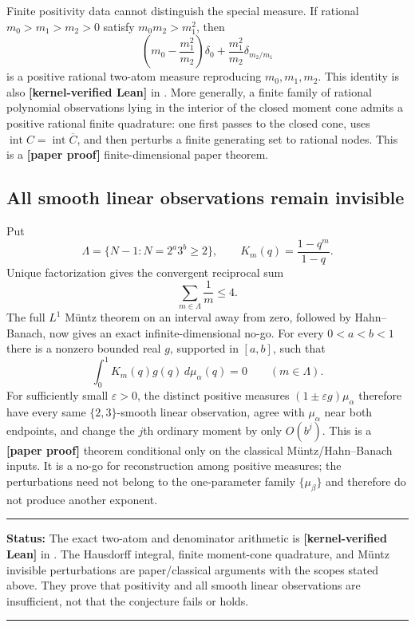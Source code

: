 \documentclass[11pt,oneside]{article}
\theoremstyle{definition}
\theoremstyle{remark}
\newcommand{\lean}[1]{\texttt{\detokenize{#1}}}
\newcommand{\statuslean}{\textcolor{leanblue}{\textbf{[kernel-verified Lean]}}}
\newcommand{\statusnew}{\textcolor{newgreen}{\textbf{[paper proof]}}}
\newenvironment{statusbox}[1]
{\begin{center}\begin{minipage}{0.94\textwidth}\raggedright\hbadness=10000\hrule
\vspace{0.45em}\textbf{Status:} #1\par\vspace{0.35em}}
{\vspace{0.35em}\hrule\end{minipage}\end{center}}
\begin{document}
Finite positivity data cannot distinguish the special measure.  If rational
$m_0>m_1>m_2>0$ satisfy $m_0m_2>m_1^2$, then
\begin{equation}
 \left(m_0-\frac{m_1^2}{m_2}\right)\delta_0
 +\frac{m_1^2}{m_2}\delta_{m_2/m_1}
 \label{mom:eq-two-atom}
\end{equation}
is a positive rational two-atom measure reproducing $m_0,m_1,m_2$.  This identity is also
\statuslean{} in \lean{MomentArithmetic}.  More generally, a finite family of
rational polynomial observations lying in the interior of the closed moment cone admits a
positive rational finite quadrature: one first passes to the closed cone, uses
$\operatorname{int}C=\operatorname{int}\overline C$, and then perturbs a finite generating
set to rational nodes.  This is a \statusnew{} finite-dimensional paper theorem.

\subsection{All smooth linear observations remain invisible}
\label{mom:muntz}

Put
\[
 \Lambda=\{N-1:N=2^a3^b\ge2\},\qquad
 K_m(q)=\frac{1-q^m}{1-q}.
\]
Unique factorization gives the convergent reciprocal sum
\begin{equation}
 \sum_{m\in\Lambda}\frac1m\le4.
 \label{mom:eq-muntz-sum}
\end{equation}
The full $L^1$ M\"untz theorem on an interval away from zero, followed by Hahn--Banach, now
gives an exact infinite-dimensional no-go.  For every $0<a<b<1$ there is a nonzero bounded
real $g$, supported in $[a,b]$, such that
\begin{equation}
 \int_0^1K_m(q)g(q)\,d\mu_\alpha(q)=0\qquad(m\in\Lambda).
 \label{mom:eq-invisible}
\end{equation}
For sufficiently small $\varepsilon>0$, the distinct positive measures
$(1\pm\varepsilon g)\mu_\alpha$ therefore have every same $\{2,3\}$-smooth linear
observation, agree with $\mu_\alpha$ near both endpoints, and change the $j$th ordinary
moment by only $O(b^j)$.  This is a \statusnew{} theorem conditional only on the classical
M\"untz/Hahn--Banach inputs.  It is a no-go for reconstruction among positive measures; the
perturbations need not belong to the one-parameter family $\{\mu_\beta\}$ and therefore do
not produce another exponent.

\begin{statusbox}{The exact two-atom and denominator arithmetic is \statuslean{} in
\lean{MomentArithmetic}.  The Hausdorff integral,
finite moment-cone quadrature, and M\"untz invisible perturbations are paper/classical
arguments with the scopes stated above.  They prove that positivity and all smooth linear
observations are insufficient, not that the conjecture fails or holds.}
\end{statusbox}
\end{document}
